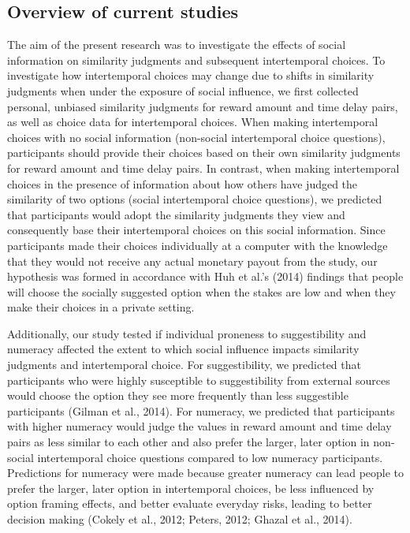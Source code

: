 \documentclass[
  pub,floatsintext]{apa6}
\begin{document}
\hypertarget{overview-of-current-studies}{%
\subsection{Overview of current studies}\label{overview-of-current-studies}}

The aim of the present research was to investigate the effects of social information on similarity judgments and subsequent intertemporal choices. To investigate how intertemporal choices may change due to shifts in similarity judgments when under the exposure of social influence, we first collected personal, unbiased similarity judgments for reward amount and time delay pairs, as well as choice data for intertemporal choices. When making intertemporal choices with no social information (non-social intertemporal choice questions), participants should provide their choices based on their own similarity judgments for reward amount and time delay pairs. In contrast, when making intertemporal choices in the presence of information about how others have judged the similarity of two options (social intertemporal choice questions), we predicted that participants would adopt the similarity judgments they view and consequently base their intertemporal choices on this social information. Since participants made their choices individually at a computer with the knowledge that they would not receive any actual monetary payout from the study, our hypothesis was formed in accordance with Huh et al.'s (2014) findings that people will choose the socially suggested option when the stakes are low and when they make their choices in a private setting.

Additionally, our study tested if individual proneness to suggestibility and numeracy affected the extent to which social influence impacts similarity judgments and intertemporal choice. For suggestibility, we predicted that participants who were highly susceptible to suggestibility from external sources would choose the option they see more frequently than less suggestible participants (Gilman et al., 2014). For numeracy, we predicted that participants with higher numeracy would judge the values in reward amount and time delay pairs as less similar to each other and also prefer the larger, later option in non-social intertemporal choice questions compared to low numeracy participants. Predictions for numeracy were made because greater numeracy can lead people to prefer the larger, later option in intertemporal choices, be less influenced by option framing effects, and better evaluate everyday risks, leading to better decision making (Cokely et al., 2012; Peters, 2012; Ghazal et al., 2014).
\end{document}
